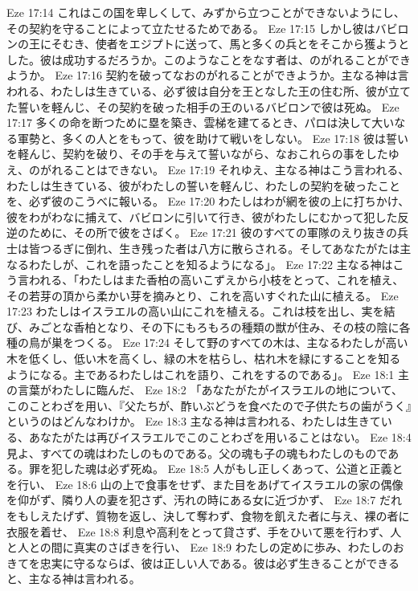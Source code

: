 Eze 17:14  これはこの国を卑しくして、みずから立つことができないようにし、その契約を守ることによって立たせるためである。
Eze 17:15  しかし彼はバビロンの王にそむき、使者をエジプトに送って、馬と多くの兵とをそこから獲ようとした。彼は成功するだろうか。このようなことをなす者は、のがれることができようか。
Eze 17:16  契約を破ってなおのがれることができようか。主なる神は言われる、わたしは生きている、必ず彼は自分を王となした王の住む所、彼が立てた誓いを軽んじ、その契約を破った相手の王のいるバビロンで彼は死ぬ。
Eze 17:17  多くの命を断つために塁を築き、雲梯を建てるとき、パロは決して大いなる軍勢と、多くの人とをもって、彼を助けて戦いをしない。
Eze 17:18  彼は誓いを軽んじ、契約を破り、その手を与えて誓いながら、なおこれらの事をしたゆえ、のがれることはできない。
Eze 17:19  それゆえ、主なる神はこう言われる、わたしは生きている、彼がわたしの誓いを軽んじ、わたしの契約を破ったことを、必ず彼のこうべに報いる。
Eze 17:20  わたしはわが網を彼の上に打ちかけ、彼をわがわなに捕えて、バビロンに引いて行き、彼がわたしにむかって犯した反逆のために、その所で彼をさばく。
Eze 17:21  彼のすべての軍隊のえり抜きの兵士は皆つるぎに倒れ、生き残った者は八方に散らされる。そしてあなたがたは主なるわたしが、これを語ったことを知るようになる」。
Eze 17:22  主なる神はこう言われる、「わたしはまた香柏の高いこずえから小枝をとって、これを植え、その若芽の頂から柔かい芽を摘みとり、これを高いすぐれた山に植える。
Eze 17:23  わたしはイスラエルの高い山にこれを植える。これは枝を出し、実を結び、みごとな香柏となり、その下にもろもろの種類の獣が住み、その枝の陰に各種の鳥が巣をつくる。
Eze 17:24  そして野のすべての木は、主なるわたしが高い木を低くし、低い木を高くし、緑の木を枯らし、枯れ木を緑にすることを知るようになる。主であるわたしはこれを語り、これをするのである」。
Eze 18:1  主の言葉がわたしに臨んだ、
Eze 18:2  「あなたがたがイスラエルの地について、このことわざを用い、『父たちが、酢いぶどうを食べたので子供たちの歯がうく』というのはどんなわけか。
Eze 18:3  主なる神は言われる、わたしは生きている、あなたがたは再びイスラエルでこのことわざを用いることはない。
Eze 18:4  見よ、すべての魂はわたしのものである。父の魂も子の魂もわたしのものである。罪を犯した魂は必ず死ぬ。
Eze 18:5  人がもし正しくあって、公道と正義とを行い、
Eze 18:6  山の上で食事をせず、また目をあげてイスラエルの家の偶像を仰がず、隣り人の妻を犯さず、汚れの時にある女に近づかず、
Eze 18:7  だれをもしえたげず、質物を返し、決して奪わず、食物を飢えた者に与え、裸の者に衣服を着せ、
Eze 18:8  利息や高利をとって貸さず、手をひいて悪を行わず、人と人との間に真実のさばきを行い、
Eze 18:9  わたしの定めに歩み、わたしのおきてを忠実に守るならば、彼は正しい人である。彼は必ず生きることができると、主なる神は言われる。
